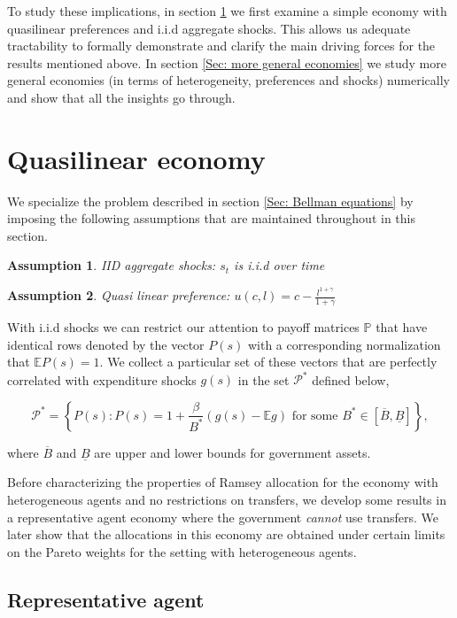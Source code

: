 \documentclass[11.5pt,twoside]{article}
\newtheorem{assumption}{Assumption}
\begin{document}
To study these implications, in section \ref{Sec: quasilinear} we first examine a simple economy with quasilinear preferences and i.i.d aggregate shocks. This allows us adequate tractability to formally demonstrate and clarify the main driving forces for the results mentioned above. In section \ref{Sec: more general economies} we study more general economies (in terms of heterogeneity, preferences and shocks) numerically and show that all the insights go through.


\section{Quasilinear economy}
\label{Sec: quasilinear}
We specialize the problem described in section \ref{Sec: Bellman equations} by imposing the following assumptions that are maintained throughout in this section. 
\begin{assumption}
\label{ass iid}
IID aggregate shocks: $s_t$ is i.i.d over time
\end{assumption}
\begin{assumption}
\label{ass quasilinear}
Quasi linear preference: $u(c,l)=c-\frac{l^{1+\gamma}}{1+\gamma}$
\end{assumption}

With i.i.d shocks we can restrict our attention to payoff matrices $\mathbb{P}$ that have identical rows denoted by the vector $P(s)$ with a corresponding normalization that $\mathbb{E}P(s)=1$.  We collect a particular set of these vectors that are perfectly correlated with expenditure shocks $g(s)$ in the set $\mathcal{P}^*$ defined below,

\[\mathcal{P}^*=\left\{P(s): P(s) = 1+ \frac{\beta}{ B^*}(g(s) - \mathbb{E} g) \text{ for some } B^*\in[\overline{B},\underline{B}] \right\},\]

where $\overline{B}$ and $\underline{B}$ are upper and lower bounds for government assets. 

Before characterizing the properties of Ramsey allocation for the economy with heterogeneous agents and no restrictions on transfers, we develop some results in a representative agent economy where the government \textit{cannot} use transfers.  We later show that the allocations in this economy are obtained under certain limits on the Pareto weights for the setting with heterogeneous agents. 


\subsection{Representative agent }
\label{Sec: rep agent}
\end{document}
